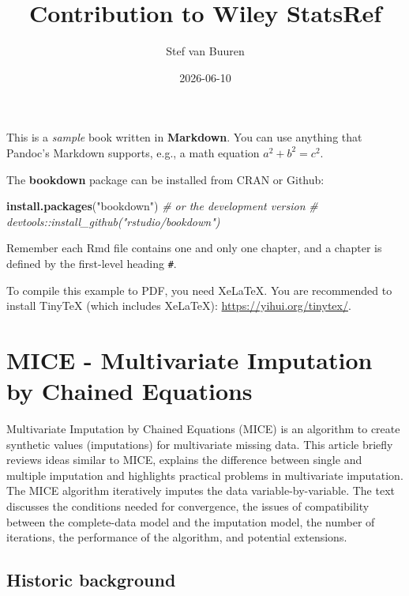 \documentclass[
]{book}
\title{Contribution to Wiley StatsRef}
\author{Stef van Buuren}
\date{2026-06-10}
\newenvironment{Shaded}{\begin{snugshade}}{\end{snugshade}}
\newcommand{\CommentTok}[1]{\textcolor[rgb]{0.56,0.35,0.01}{\textit{#1}}}
\newcommand{\FunctionTok}[1]{\textcolor[rgb]{0.13,0.29,0.53}{\textbf{#1}}}
\newcommand{\NormalTok}[1]{#1}
\newcommand{\StringTok}[1]{\textcolor[rgb]{0.31,0.60,0.02}{#1}}
\begin{document}
\maketitle

{
\setcounter{tocdepth}{1}
\tableofcontents
}
This is a \emph{sample} book written in \textbf{Markdown}. You can use anything that Pandoc's Markdown supports, e.g., a math equation \(a^2 + b^2 = c^2\).

The \textbf{bookdown} package can be installed from CRAN or Github:

\begin{Shaded}
\begin{Highlighting}[]
\FunctionTok{install.packages}\NormalTok{(}\StringTok{"bookdown"}\NormalTok{)}
\CommentTok{\# or the development version}
\CommentTok{\# devtools::install\_github("rstudio/bookdown")}
\end{Highlighting}
\end{Shaded}

Remember each Rmd file contains one and only one chapter, and a chapter is defined by the first-level heading \texttt{\#}.

To compile this example to PDF, you need XeLaTeX. You are recommended to install TinyTeX (which includes XeLaTeX): \url{https://yihui.org/tinytex/}.

\chapter{MICE - Multivariate Imputation by Chained Equations}\label{mice---multivariate-imputation-by-chained-equations}

Multivariate Imputation by Chained Equations (MICE) is an algorithm to create synthetic values (imputations) for multivariate missing data. This article briefly reviews ideas similar to MICE, explains the difference between single and multiple imputation and highlights practical problems in multivariate imputation. The MICE algorithm iteratively imputes the data variable-by-variable. The text discusses the conditions needed for convergence, the issues of compatibility between the complete-data model and the imputation model, the number of iterations, the performance of the algorithm, and potential extensions.

\section{Historic background}\label{historic-background}
\end{document}
